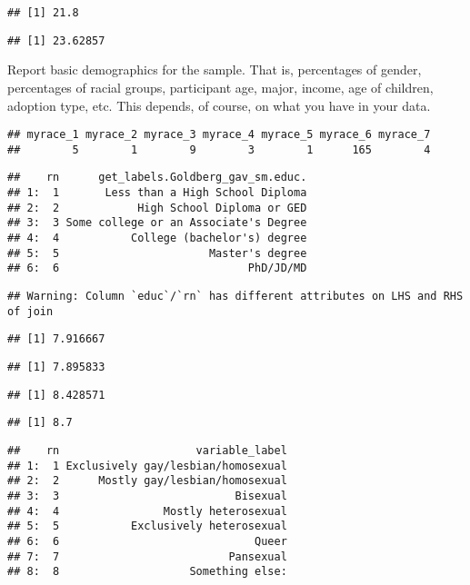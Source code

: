 \documentclass[man]{apa6}
\begin{document}
\begin{verbatim}
## [1] 21.8
\end{verbatim}

\begin{verbatim}
## [1] 23.62857
\end{verbatim}

Report basic demographics for the sample. That is, percentages of gender,
percentages of racial groups, participant age, major, income, age of children,
adoption type, etc. This depends, of course, on what you have in your data.

\begin{verbatim}
## myrace_1 myrace_2 myrace_3 myrace_4 myrace_5 myrace_6 myrace_7 
##        5        1        9        3        1      165        4
\end{verbatim}

\begin{verbatim}
##    rn      get_labels.Goldberg_gav_sm.educ.
## 1:  1       Less than a High School Diploma
## 2:  2            High School Diploma or GED
## 3:  3 Some college or an Associate's Degree
## 4:  4           College (bachelor's) degree
## 5:  5                       Master's degree
## 6:  6                             PhD/JD/MD
\end{verbatim}

\begin{verbatim}
## Warning: Column `educ`/`rn` has different attributes on LHS and RHS of join
\end{verbatim}

\begin{verbatim}
## [1] 7.916667
\end{verbatim}

\begin{verbatim}
## [1] 7.895833
\end{verbatim}

\begin{verbatim}
## [1] 8.428571
\end{verbatim}

\begin{verbatim}
## [1] 8.7
\end{verbatim}

\begin{verbatim}
##    rn                     variable_label
## 1:  1 Exclusively gay/lesbian/homosexual
## 2:  2      Mostly gay/lesbian/homosexual
## 3:  3                           Bisexual
## 4:  4                Mostly heterosexual
## 5:  5           Exclusively heterosexual
## 6:  6                              Queer
## 7:  7                          Pansexual
## 8:  8                    Something else:
\end{verbatim}
\end{document}
